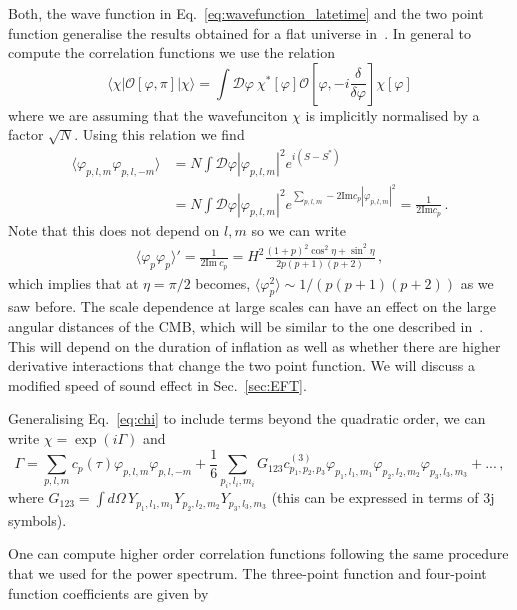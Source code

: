 \documentclass[a4paper,11pt]{article}
\numberwithin{equation}{section}
\numberwithin{equation}{section}
\begin{document}
Both, the wave function in Eq.~\eqref{eq:wavefunction_latetime} and the two point function generalise the results obtained for a flat universe in~\cite{Maldacena:2002vr}.
In general to compute the correlation functions we use the relation
 \begin{equation}
 \langle \chi\vert \mathcal{O}[\varphi,\pi]\vert\chi\rangle=\int\mathcal{D}\varphi\ \chi^*[\varphi]\mathcal{O}\left[\varphi,-i\frac{\delta}{\delta\varphi}\right]\chi[\varphi]\label{eq:pathintegral}
\end{equation}
where we are assuming that the wavefunciton $\chi$ is implicitly normalised by a factor $\sqrt {N}$. Using this relation we find
\begin{align}
\langle\varphi_{p, l, m}\varphi_{p, l, -m}\rangle&=N\int\mathcal{D}\varphi |\varphi_{p, l, m}|^2e^{i {(S-S^*)}}\nonumber\\
&=N\int\mathcal{D}\varphi |\varphi_{p, l, m}|^2 e^{\sum_{p, l, m}-2\mathrm{Im}{c_p}|\varphi_{p, l, m}|^2}=\frac{1}{2\mathrm{Im}{c_p}} \,.
\end{align}
Note that this does not depend on $l, m$ so we can write
 \begin{align}
 \langle\varphi_p\varphi_{p}\rangle'=\frac{1}{2\text{Im}\  c_p}=H^2\frac{(1+p)^2\cos^2\eta+\sin^2\eta}{2p(p+1)(p+2)} \,,
 \label{eq:2pointfunction}
 \end{align}
 which implies that at $\eta=\pi/2$ becomes, $\langle\varphi_p^2\rangle\sim 1/(p(p+1)(p+2))$ as we saw before. The scale dependence at large scales can have an effect on the large angular distances of the CMB, which will be similar to the one described in~\cite{Cespedes:2020xpn}. This will depend on the duration of inflation as well as  whether there are higher derivative interactions that change the two point function. We will discuss a modified speed of sound effect in Sec.~\ref{sec:EFT}.

Generalising Eq.~\eqref{eq:chi} to include terms beyond the quadratic order, we can write $\chi=\exp\left(i\Gamma\right)$ and 
\begin{equation}
\label{eq:Gamma}
\Gamma=\sum_{p, l,m} c_p(\tau)\varphi_{p, l, m}\varphi_{p, l, -m}+\frac{1}{6} \sum_{p_i, l_i, m_i}G_{123} c^{(3)}_{p_1,p_2,p_3}\varphi_{p_1, l_1, m_1} \varphi_{p_2, l_2, m_2} \varphi_{p_3, l_3, m_3}+... \,,
\end{equation}
where $G_{123} =\int d\Omega \, Y_{p_1, l_1, m_1} Y_{p_2, l_2, m_2}Y_{p_3, l_3, m_3}$ (this can be expressed in terms of 3j symbols).

One can compute higher order correlation functions following the same procedure that we used for the power spectrum. The three-point function and four-point function coefficients are given by
\end{document}

